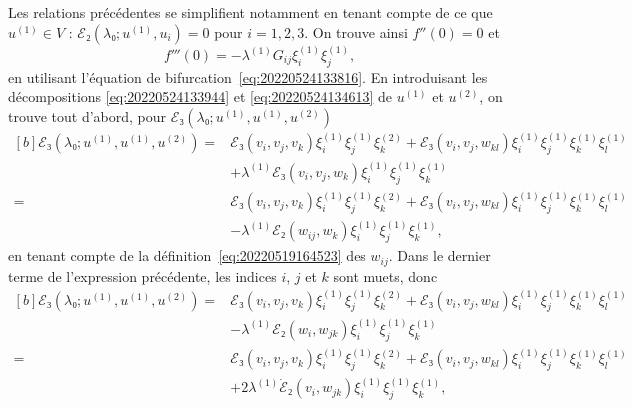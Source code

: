 \documentclass[12pt, final]{scrartcl}
\theoremstyle{definition}
\newcommand{\order}[2][1]{#2^{(#1)}}
\begin{document}
Les relations précédentes se simplifient notamment en tenant compte de ce que
\(\order[1]u∈V\) : \(ℰ₂(λ₀; \order[1]u, u_i) = 0\) pour \(i = 1, 2, 3\). On trouve ainsi
\(f''(0)=0\) et
\begin{equation}
  \label{eq:20220601055448}
  f'''(0) = -\order[1]λ G_{ij} \order[1]{ξ_i} \order[1]{ξ_j},
\end{equation}
en utilisant l'équation de bifurcation~\eqref{eq:20220524133816}. En
introduisant les décompositions \eqref{eq:20220524133944} et
\eqref{eq:20220524134613} de \(\order[1]u\) et \(\order[2]u\), on trouve tout d'abord, pour
\(ℰ₃(λ₀; \order[1]u, \order[1]u, \order[2]u)\)
\begin{equation*}
  \begin{aligned}[b]
    ℰ₃(λ₀; \order[1]u, \order[1]u, \order[2]u)
    ={} & ℰ₃(v_i, v_j, v_k) \order[1]{ξ_i} \order[1]{ξ_j} \order[2]{ξ_k} + ℰ₃(v_i, v_j, w_{k l}) \order[1]{ξ_i} \order[1]{ξ_j} \order[1]{ξ_k} \order[1]{ξ_l}\\
    & + \order[1]λ ℰ₃(v_i, v_j, w_k) \order[1]{ξ_i} \order[1]{ξ_j} \order[1]{ξ_k} \\
    ={} & ℰ₃(v_i, v_j, v_k) \order[1]{ξ_i} \order[1]{ξ_j} \order[2]{ξ_k} + ℰ₃(v_i, v_j, w_{k l}) \order[1]{ξ_i} \order[1]{ξ_j} \order[1]{ξ_k} \order[1]{ξ_l}\\
    & - \order[1]λ ℰ₂(w_{ij}, w_k) \order[1]{ξ_i} \order[1]{ξ_j} \order[1]{ξ_k},
  \end{aligned}
\end{equation*}
en tenant compte de la définition~\eqref{eq:20220519164523} des \(w_{ij}\). Dans
le dernier terme de l'expression précédente, les indices \(i\), \(j\) et \(k\)
sont muets, donc
\begin{equation*}
  \begin{aligned}[b]
    ℰ₃(λ₀; \order[1]u, \order[1]u, \order[2]u)
    ={} & ℰ₃(v_i, v_j, v_k) \order[1]{ξ_i} \order[1]{ξ_j} \order[2]{ξ_k} + ℰ₃(v_i, v_j, w_{kl}) \order[1]{ξ_i} \order[1]{ξ_j} \order[1]{ξ_k} \order[1]{ξ_l}\\
    & - \order[1]λ ℰ₂(w_{i}, w_{jk}) \order[1]{ξ_i} \order[1]{ξ_j} \order[1]{ξ_k}\\
    ={} & ℰ₃(v_i, v_j, v_k) \order[1]{ξ_i} \order[1]{ξ_j} \order[2]{ξ_k} + ℰ₃(v_i, v_j, w_{kl}) \order[1]{ξ_i} \order[1]{ξ_j} \order[1]{ξ_k} \order[1]{ξ_l}\\
    & + 2 \order[1]λ \dot{ℰ}₂(v_{i}, w_{jk}) \order[1]{ξ_i} \order[1]{ξ_j} \order[1]{ξ_k},
  \end{aligned}
\end{equation*}
\end{document}
